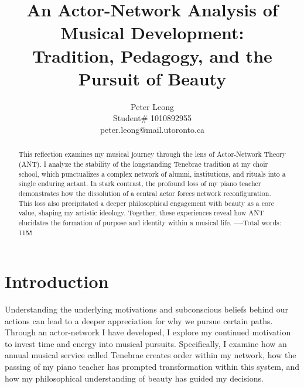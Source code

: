 \documentclass{article} %
\title{An Actor-Network Analysis of Musical Development:\\
Tradition, Pedagogy, and the Pursuit of Beauty}
\author{Peter Leong \\
Student\# 1010892955 \\
peter.leong@mail.utoronto.ca \\
\AND
}
\begin{document}
\vspace{-4ex}

\maketitle

\vspace{-12ex}

\begin{abstract}
This reflection examines my musical journey through the lens of Actor-Network Theory (ANT). 
I analyze the stability of the longstanding Tenebrae tradition at my choir school, which punctualizes a complex network of alumni, institutions, and rituals into a single enduring actant. 
In stark contrast, the profound loss of my piano teacher demonstrates how the dissolution of a central actor forces network reconfiguration. 
This loss also precipitated a deeper philosophical engagement with beauty as a core value, shaping my artistic ideology. 
Together, these experiences reveal how ANT elucidates the formation of purpose and identity within a musical life.
----Total words: 1155
\end{abstract}

\vspace{-2ex}


\section{Introduction}

Understanding the underlying motivations and subconscious beliefs behind our actions can lead to a deeper appreciation for why we pursue certain paths. 
Through an actor-network I have developed, I explore my continued motivation to invest time and energy into musical pursuits. 
Specifically, I examine how an annual musical service called Tenebrae creates order within my network, how the passing of my piano teacher has prompted transformation within this system, and how my philosophical understanding of beauty has guided my decisions.
\end{document}

